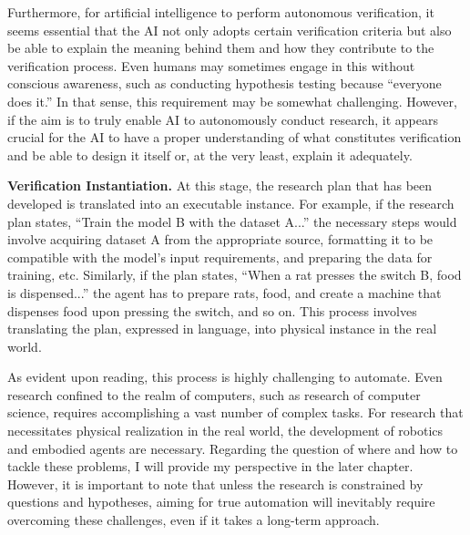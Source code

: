 \documentclass{book}
\begin{document}
Furthermore, for artificial intelligence to perform autonomous verification, it seems essential that the AI not only adopts certain verification criteria but also be able to explain the meaning behind them and how they contribute to the verification process. Even humans may sometimes engage in this without conscious awareness, such as conducting hypothesis testing because ``everyone does it.'' In that sense, this requirement may be somewhat challenging. However, if the aim is to truly enable AI to autonomously conduct research, it appears crucial for the AI to have a proper understanding of what constitutes verification and be able to design it itself or, at the very least, explain it adequately.

\textbf{Verification Instantiation.} At this stage, the research plan that has been developed is translated into an executable instance. For example, if the research plan states, ``Train the model B with the dataset A...'' the necessary steps would involve acquiring dataset A from the appropriate source, formatting it to be compatible with the model's input requirements, and preparing the data for training, etc. Similarly, if the plan states, ``When a rat presses the switch B, food is dispensed...'' the agent has to prepare rats, food, and create a machine that dispenses food upon pressing the switch, and so on. This process involves translating the plan, expressed in language, into physical instance in the real world.

As evident upon reading, this process is highly challenging to automate. Even research confined to the realm of computers, such as research of computer science, requires accomplishing a vast number of complex tasks. For research that necessitates physical realization in the real world, the development of robotics and embodied agents are necessary. Regarding the question of where and how to tackle these problems, I will provide my perspective in the later chapter. However, it is important to note that unless the research is constrained by questions and hypotheses, aiming for true automation will inevitably require overcoming these challenges, even if it takes a long-term approach.



\end{document}
